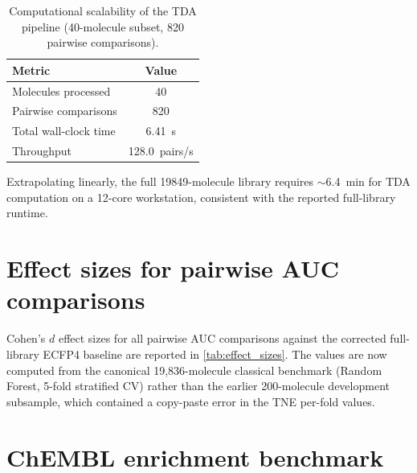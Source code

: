 \documentclass[11pt,a4paper]{article}
\begin{document}
\begin{table}[htbp]
\centering
\caption{Computational scalability of the TDA pipeline (40-molecule subset, 820 pairwise comparisons).}
\label{tab:scalability}
\begin{tabularx}{\textwidth}{l S[table-format=1.2]}
\toprule
Metric & {Value} \\
\midrule
Molecules processed & 40 \\
Pairwise comparisons & 820 \\
Total wall-clock time & 6.41~s \\
Throughput & 128.0~pairs/s \\
\bottomrule
\end{tabularx}
\vspace{1mm}
\footnotesize Extrapolating linearly, the full \num{19849}-molecule library requires $\sim$\SI{6.4}{\minute} for TDA computation on a 12-core workstation, consistent with the reported full-library runtime.
\end{table}


\section{Effect sizes for pairwise AUC comparisons}
\label{sec:effect_sizes}

Cohen's $d$ effect sizes for all pairwise AUC comparisons against the corrected full-library ECFP4 baseline are reported in \cref{tab:effect_sizes}. The values are now computed from the canonical 19,836-molecule classical benchmark (Random Forest, 5-fold stratified CV) rather than the earlier 200-molecule development subsample, which contained a copy-paste error in the TNE per-fold values.





\section{ChEMBL enrichment benchmark}
\label{sec:chembl_enrichment}
\end{document}

